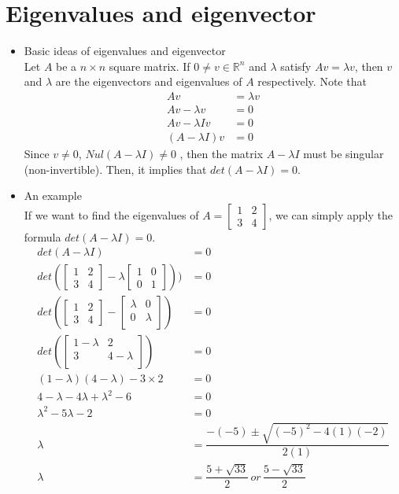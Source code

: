 \documentclass[11pt]{article}
\begin{document}
\section{Eigenvalues and eigenvector}
\begin{itemize}
	\item Basic ideas of eigenvalues and eigenvector\\
	Let $A$ be a $n \times n$ square matrix. If $0 \neq v \in \mathbb{R}^n$ and $\lambda$ satisfy $Av = \lambda v$, then $v$ and $\lambda$ are the eigenvectors and eigenvalues  of $A$ respectively. Note that
	\begin{align*}
		Av				&=	\lambda v\\
		Av - \lambda v 	&=	0\\
		Av - \lambda I v&=	0\\
		(A - \lambda I)v&= 0
	\end{align*}
	Since $v \neq 0$, $Nul(A - \lambda I) \neq 0$ , then the matrix $A- \lambda I$ must be singular (non-invertible). Then, it implies that $det(A - \lambda I) = 0$.
	
	\item An example\\
	If we want to find the eigenvalues of $A = 
	\begin{bmatrix}
	1& 2\\
	3& 4
	\end{bmatrix}$, 
	we can simply apply the formula $det(A - \lambda I) = 0$.
	\begin{align*}
		det(A - \lambda I) &= 0\\
		det(\begin{bmatrix}
			1& 2\\
			3& 4
		\end{bmatrix} - \lambda 
		\begin{bmatrix}
		1& 0\\
		0& 1
		\end{bmatrix})) &= 0\\
		det(\begin{bmatrix}
			1& 2\\
			3& 4
		\end{bmatrix} - 
		\begin{bmatrix}
		\lambda& 0\\
		0& \lambda\\
		\end{bmatrix}) &= 0\\
		det(\begin{bmatrix}
		1-\lambda& 2\\
		3&		4-\lambda\\
		\end{bmatrix})&=0\\
		(1-\lambda)(4-\lambda)-3\times2 &= 0\\
		4-\lambda-4\lambda+\lambda^2 -6 &=0\\
		\lambda^2-5\lambda-2&= 0\\
		\lambda&= \dfrac{-(-5) \pm \sqrt{(-5)^2 -4 (1) (-2)}}{2(1)}\\
		\lambda&= \dfrac{5 + \sqrt{33}}{2} \,or\, \dfrac{5 - \sqrt{33}}{2}
	\end{align*}
	

\end{itemize}
\end{document}
